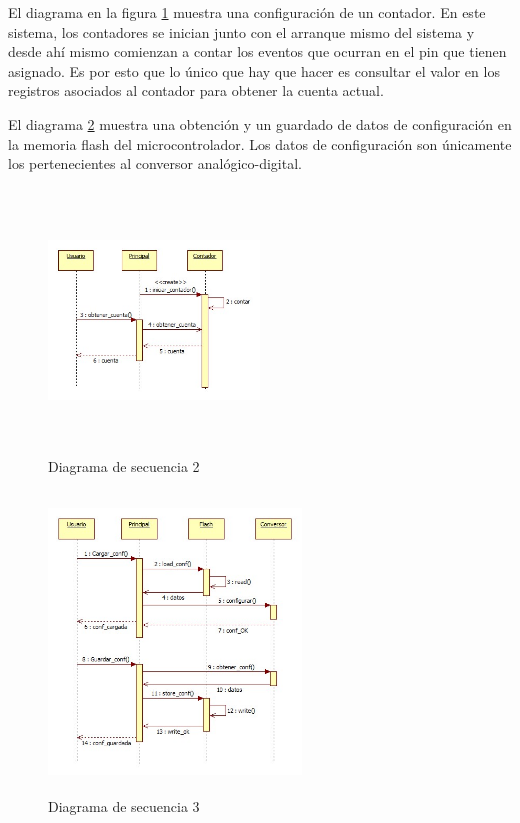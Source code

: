 \documentclass{article}
\theoremstyle{definition}
\theoremstyle{remark}
\begin{document}
El diagrama en la figura \ref{fig:secuencia2} muestra una configuración de un contador. En este sistema, los contadores se inician junto con el arranque mismo del sistema y desde ahí mismo comienzan a contar los eventos que ocurran en el pin que tienen asignado. Es por esto que lo único que hay que hacer es consultar el valor en los registros asociados al contador para obtener la cuenta actual.

El diagrama \ref{fig:secuencia3} muestra una obtención y un guardado de datos de configuración en la memoria flash del microcontrolador. Los datos de configuración son únicamente los pertenecientes al conversor analógico-digital.

\begin{figure}[h]
  \centering
  \includegraphics[width=0.50\textwidth, height = 7cm]{Secuencia2}
  \caption{\small Diagrama de secuencia 2}\label{fig:secuencia2}
\end{figure}


\begin{figure}[H]
  \centering
  \includegraphics[width=0.60\textwidth, height = 8cm]{Secuencia3}
  \caption{\small Diagrama de secuencia 3}\label{fig:secuencia3}
\end{figure}
\end{document}
